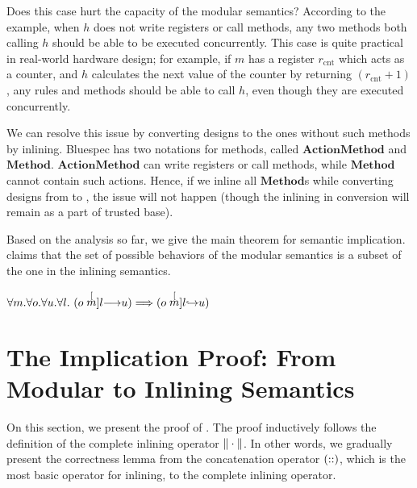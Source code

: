 Does this case hurt the capacity of the modular semantics? According
to the example, when $h$ does not write registers or call methods, any
two methods both calling $h$ should be able to be executed
concurrently. This case is quite practical in real-world hardware
design; for example, if $m$ has a register $r_{\textrm{cnt}}$ which
acts as a counter, and $h$ calculates the next value of the counter by
returning $(r_{\textrm{cnt}} + 1)$, any rules and methods should be
able to call $h$, even though they are executed concurrently.

We can resolve this issue by converting designs to the ones without
such methods by inlining. Bluespec has two notations for methods,
called $\textbf{ActionMethod}$ and
$\textbf{Method}$. $\textbf{ActionMethod}$ can write registers or call
methods, while $\textbf{Method}$ cannot contain such actions. Hence,
if we inline all $\textbf{Method}$s while converting designs from
\Bluespec{} to \Kami{}, the issue will not happen (though the inlining
in conversion will remain as a part of trusted base).

Based on the analysis so far, we give the main theorem for semantic
implication.  claims that the set of possible
behaviors of the modular semantics is a subset of the one in the
inlining semantics.

\begin{theorem}
  \label{thm-modtoinl}
  \mbox{}
  \begin{center}
    \begin{math}
      \forall m.\forall o.\forall u.\forall l.\ 
      (\semstep{m}{o}{u}{l}) \Longrightarrow (\semstepin{m}{o}{u}{l})
    \end{math}
  \end{center}
\end{theorem}

\section{The Implication Proof: From Modular to Inlining Semantics}

On this section, we present the proof of . The
proof inductively follows the definition of the complete inlining
operator $\| \cdot \|$. In other words, we gradually present the
correctness lemma from the concatenation operator $(::)$,
which is the most basic operator for inlining, to the complete
inlining operator.

